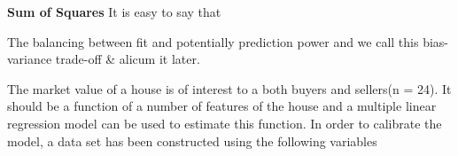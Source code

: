 \documentclass[12pt]{article}
\begin{document}
\begin{definition}
    \textbf{Sum of Squares}
    It is easy to say that

    The balancing between fit and potentially prediction power and we call this bias-variance trade-off \& alicum it later.
\end{definition}

\begin{example}
    The market value of a house is of
interest to a both buyers and sellers(n = 24). It should be a function of a
number of features of the house and a multiple linear
regression model can be used to estimate this function. In
order to calibrate the model, a data set has been constructed
using the following variables
\end{example}
\end{document}
